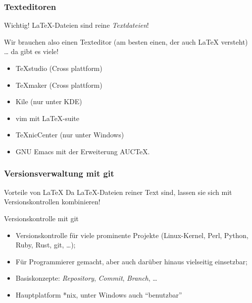 \documentclass{cms-kurs}
\begin{document}
\begin{frame}
  \frametitle{Texteditoren}

  \onslide<+->

  \begin{block}{Wichtig!}
    \LaTeX-Dateien sind reine \emph{Textdateien}!
  \end{block}

  \onslide<+->

  Wir brauchen also einen Texteditor (am besten einen, der auch \LaTeX{}
  versteht) \dots{} \onslide<+-> da gibt es viele!
  \begin{itemize}
  \item TeXstudio (Cross plattform)
  \item TeXmaker  (Cross plattform)
  \item Kile      (nur unter KDE)
  \item vim mit LaTeX-suite
  \item TeXnicCenter (nur unter Windows)
  \item GNU Emacs mit der Erweiterung AUCTeX.
  \end{itemize}

\end{frame}

\begin{frame}
  \frametitle{Versionsverwaltung mit git}

  \onslide<+->

  \begin{block}{Vorteile von \LaTeX{}}
    Da \LaTeX{}-Dateien reiner Text sind, lassen sie sich mit Versionskontrollen
    kombinieren!
  \end{block}

  \onslide<+->

  \begin{block}{Versionskontrolle mit git}
    \begin{itemize}
    \item Versionskontrolle für viele prominente Projekte (Linux-Kernel, Perl,
      Python, Ruby, Rust, git, \ldots);
    \item Für Programmierer gemacht, aber auch darüber hinaus vielseitig
      einsetzbar;
    \item Basiskonzepte: \emph{Repository}, \emph{Commit}, \emph{Branch}, \ldots
    \item Hauptplatform *nix, unter Windows auch \enquote{benutzbar}
    \end{itemize}
  \end{block}

\end{frame}
\end{document}
